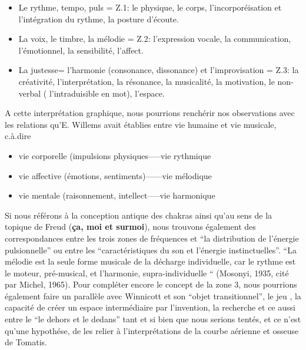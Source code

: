 \begin{itemize}
 \item Le rythme, tempo, puls  =  Z.1: le physique, le corps, l'incorporéisation et
l'intégration du rythme,
la posture d'écoute.

\item La voix, le timbre, la mélodie =  Z.2:  l'expression vocale, la communication,
l'émotionnel, la sensibilité, l'affect.

\item La justesse= l'harmonie (consonance, dissonance) et l'improvisation = Z.3:  la créativité, l'interprétation, la
résonance, la musicalité, la motivation, le non-verbal (
l'intraduisible en mot), l'espace.

\end{itemize}
A cette interprétation graphique, nous pourrions renchérir nos
observations avec les relations
qu'E.
Willems  avait établies entre vie humaine et vie musicale, c.à.dire
\begin{itemize}
  \item vie corporelle (impulsions physiques-----vie rythmique
  \item vie affective (émotions, sentiments)------vie mélodique
    \item vie mentale (raisonnement, intellect-----vie harmonique
\end{itemize}

Si nous référons à la conception antique des chakras ainsi qu'au sens de la
topique de Freud (\textbf{ça, moi et surmoi}), nous trouvons également des correspondances
entre les trois zones de 
fréquences et ``la distribution de l'énergie pulsionnelle'' ou entre
les 
``caractéristiques du son et l'énergie instinctuelles''. \autocite[ch. 13]{auriol:cle} 
``La mélodie est la seule forme musicale de la décharge individuelle, car le rythme est le moteur, pré-musical, et l'harmonie, supra-individuelle `` (Mosonyi, 1935, cité par Michel, 1965).
Pour compléter encore le concept de la zone 3, nous pourrions
également faire un parallèle avec Winnicott et son ``objet
transitionnel'', le jeu , la capacité de créer un espace
intermédiaire par l'invention, la recherche et ce aussi entre le ``le
dehors et le dedans'' tant et si bien que nous serions tentés, et ce n'est qu'une
hypothése, de les relier à l'interprétations de la courbe aérienne et osseuse de Tomatis. 
 
